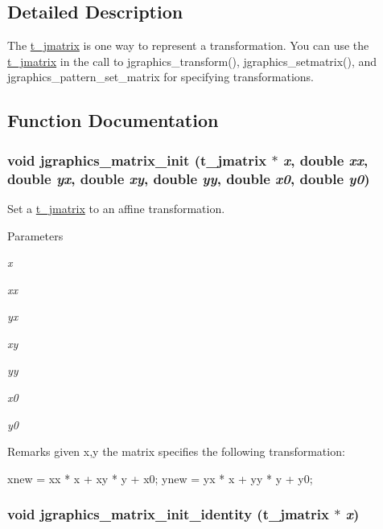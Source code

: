 \subsection{Detailed Description}
The \hyperlink{structt__jmatrix}{t\_\-jmatrix} is one way to represent a transformation. You can use the \hyperlink{structt__jmatrix}{t\_\-jmatrix} in the call to jgraphics\_\-transform(), jgraphics\_\-setmatrix(), and jgraphics\_\-pattern\_\-set\_\-matrix for specifying transformations. 

\subsection{Function Documentation}
\hypertarget{group__jmatrix_gafb24446d0616fbfca7d8bb96ba97b4ef}{
\subsubsection[{jgraphics\_\-matrix\_\-init}]{\setlength{\rightskip}{0pt plus 5cm}void jgraphics\_\-matrix\_\-init ({\bf t\_\-jmatrix} $\ast$ {\em x}, \/  double {\em xx}, \/  double {\em yx}, \/  double {\em xy}, \/  double {\em yy}, \/  double {\em x0}, \/  double {\em y0})}}
\label{group__jmatrix_gafb24446d0616fbfca7d8bb96ba97b4ef}


Set a \hyperlink{structt__jmatrix}{t\_\-jmatrix} to an affine transformation. 
\begin{DoxyParams}{Parameters}
\item[{\em x}]\item[{\em xx}]\item[{\em yx}]\item[{\em xy}]\item[{\em yy}]\item[{\em x0}]\item[{\em y0}]\end{DoxyParams}
\begin{DoxyRemark}{Remarks}
given x,y the matrix specifies the following transformation: 
\begin{DoxyCode}
    xnew = xx * x + xy * y + x0; 
    ynew = yx * x + yy * y + y0;
\end{DoxyCode}
 
\end{DoxyRemark}
\hypertarget{group__jmatrix_ga7f07986602f12117cfd79e82fb1338d7}{
\subsubsection[{jgraphics\_\-matrix\_\-init\_\-identity}]{\setlength{\rightskip}{0pt plus 5cm}void jgraphics\_\-matrix\_\-init\_\-identity ({\bf t\_\-jmatrix} $\ast$ {\em x})}}
\label{group__jmatrix_ga7f07986602f12117cfd79e82fb1338d7}



